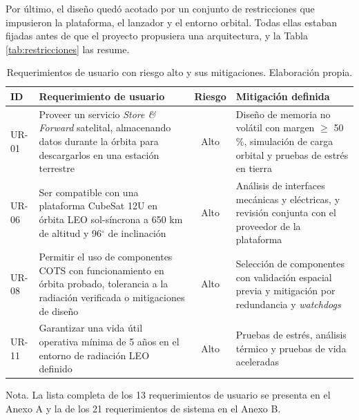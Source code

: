 Por último, el diseño quedó acotado por un conjunto de restricciones que impusieron la plataforma, el lanzador y el entorno orbital. Todas ellas estaban fijadas antes de que el proyecto propusiera una arquitectura, y la Tabla \ref{tab:restricciones} las resume.

\begin{table}[H]
\centering
\begin{threeparttable}
\caption{Requerimientos de usuario con riesgo alto y sus mitigaciones. Elaboración propia.\vspace{1ex}}
\label{tab:riesgoalto}
\small
\begin{tabularx}{\textwidth}{|@{\hspace{4pt}}l X c X@{\hspace{4pt}}|}
\toprule
\textbf{ID} & \textbf{Requerimiento de usuario} & \textbf{Riesgo} & \textbf{Mitigación definida} \\
\midrule
UR-01 & Proveer un servicio \textit{Store \& Forward} satelital, almacenando datos durante la órbita para descargarlos en una estación terrestre & Alto & Diseño de memoria no volátil con margen $\geq$ 50\,\%, simulación de carga orbital y pruebas de estrés en tierra \\

UR-06 & Ser compatible con una plataforma CubeSat 12U en órbita LEO sol-síncrona a 650 km de altitud y 96$^{\circ}$ de inclinación & Alto & Análisis de interfaces mecánicas y eléctricas, y revisión conjunta con el proveedor de la plataforma \\

UR-08 & Permitir el uso de componentes COTS con funcionamiento en órbita probado, tolerancia a la radiación verificada o mitigaciones de diseño & Alto & Selección de componentes con validación espacial previa y mitigación por redundancia y \textit{watchdogs} \\

UR-11 & Garantizar una vida útil operativa mínima de 5 años en el entorno de radiación LEO definido & Alto & Pruebas de estrés, análisis térmico y pruebas de vida aceleradas \\
\bottomrule
\end{tabularx}
\begin{tablenotes}[flushleft]\footnotesize
\item Nota. La lista completa de los 13 requerimientos de usuario se presenta en el Anexo A y la de los 21 requerimientos de sistema en el Anexo B.
\end{tablenotes}
\end{threeparttable}
\end{table}

